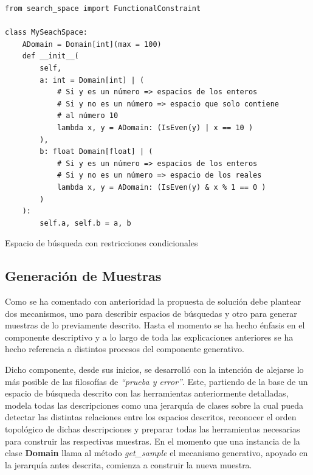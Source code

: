 \begin{listing}[!ht]
    \begin{verbatim}
from search_space import FunctionalConstraint

class MySeachSpace:
    ADomain = Domain[int](max = 100)
    def __init__(
        self, 
        a: int = Domain[int] | (
            # Si y es un número => espacios de los enteros
            # Si y no es un número => espacio que solo contiene
            # al número 10
            lambda x, y = ADomain: (IsEven(y) | x == 10 )
        ),
        b: float Domain[float] | (
            # Si y es un número => espacios de los enteros
            # Si y no es un número => espacio de los reales 
            lambda x, y = ADomain: (IsEven(y) & x % 1 == 0 )
        )             
    ):
        self.a, self.b = a, b

    \end{verbatim}
    \caption{Espacio de búsqueda con restricciones condicionales}
    \label{ex:classCond}
\end{listing}

\subsection{Generación de Muestras}

Como se ha comentado con anterioridad la propuesta de solución debe plantear dos mecanismos, uno para describir espacios
de búsquedas y otro para generar muestras de lo previamente descrito. Hasta el momento se ha hecho énfasis en el componente
descriptivo y a lo largo de toda las explicaciones anteriores se ha hecho referencia a distintos procesos del componente generativo.

Dicho componente, desde sus inicios, se desarrolló con la intención de alejarse lo más posible de las filosofías de
    {\it “prueba y error”}. Este, partiendo de la base de un espacio de búsqueda descrito con las herramientas anteriormente
detalladas, modela todas las descripciones como una jerarquía de clases sobre la cual pueda detectar las distintas
relaciones entre los espacios descritos, reconocer el orden topológico de dichas descripciones y preparar todas las
herramientas necesarias para construir las respectivas muestras. En el momento que una instancia de la
clase {\bf Domain} llama al método {\it get\_sample} el mecanismo generativo, apoyado en la jerarquía antes descrita, comienza
a construir la nueva muestra.


